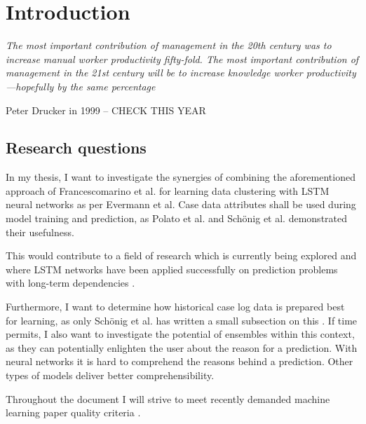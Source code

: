 \chapter{Introduction}\label{sec:intro}
\setlength{\epigraphwidth}{0.9\textwidth}
\renewcommand{\epigraphrule}{0pt}
\epigraph{\textit{The most important contribution of management in the 20th century was to increase manual worker productivity fifty-fold. The most important contribution of management in the 21st century will be to increase knowledge worker productivity—hopefully by the same percentage}}{Peter Drucker in 1999 -- CHECK THIS YEAR}

\lipsum[1-4]

\section{Research questions}\label{sec:intro:objective}

In my thesis, I want to investigate the synergies of combining the aforementioned approach of Francescomarino et al. for learning data clustering with LSTM neural networks as per Evermann et al. Case data attributes shall be used during model training and prediction, as Polato et al. \cite{polato2014} and Schönig et al. \cite{schoenig2018} demonstrated their usefulness.

This would contribute to a field of research which is currently being explored and where LSTM networks have been applied successfully on prediction problems with long-term dependencies \cite{evermann2016, tax2017, schoenig2018, graves2005}.

Furthermore, I want to determine how historical case log data is prepared best for learning, as only Schönig et al. has written a small subsection on this \cite{schoenig2018}.
If time permits, I also want to investigate the potential of ensembles within this context, as they can potentially enlighten the user about the reason for a prediction.
With neural networks it is hard to comprehend the reasons behind a prediction.
Other types of models deliver better comprehensibility.

Throughout the document I will strive to meet recently demanded machine learning paper quality criteria \cite{lipton2018}.

